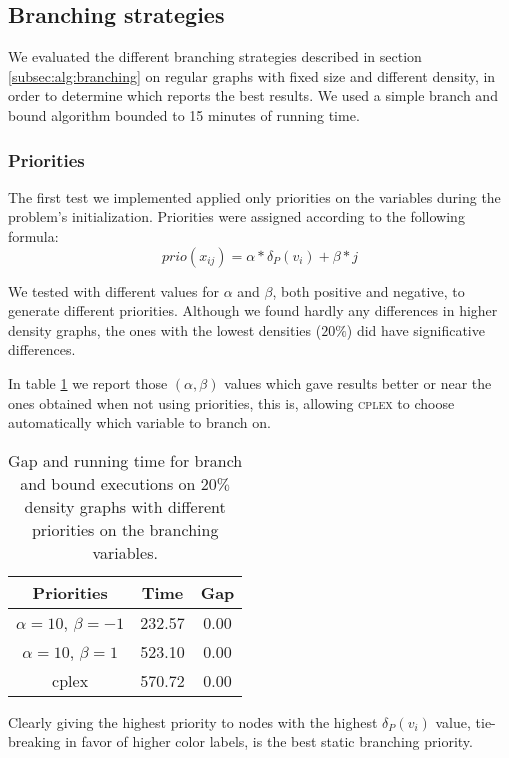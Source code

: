 
\subsection{Branching strategies}
\label{subsec:resultsbranching}

We evaluated the different branching strategies described in section \ref{subsec:alg:branching} on regular graphs with fixed size and different density, in order to determine which reports the best results. We used a simple branch and bound algorithm bounded to 15 minutes of running time.

\subsubsection*{Priorities}

The first test we implemented applied only priorities on the variables during the problem's initialization. Priorities were assigned according to the following formula:
\begin{equation*}
	prio(x_{ij}) = \alpha * \delta_P(v_i) + \beta * j
\end{equation*}

We tested with different values for $\alpha$ and $\beta$, both positive and negative, to generate different priorities. Although we found hardly any differences in higher density graphs, the ones with the lowest densities ($20\%$) did have significative differences.

In table \ref{table:branch:static} we report those $(\alpha,\beta)$ values which gave results better or near the ones obtained when not using priorities, this is, allowing \textsc{cplex} to choose automatically which variable to branch on.

\begin{table}
\label{table:branch:static}
\centering

\begin{tabular}{|c|c|c|}
\hline
\textbf{Priorities} & \textbf{Time} & \textbf{Gap} \\
\hline
$\alpha = 10$, $\beta = -1$ &  232.57 & 0.00 \\
$\alpha = 10$, $\beta = 1$ & 523.10 & 0.00 \\
cplex & 570.72 & 0.00 \\
\hline
 \end{tabular}

Clearly giving the highest priority to nodes with the highest $\delta_P(v_i)$ value, tie-breaking in favor of higher color labels, is the best static branching priority.

\caption{Gap and running time for branch and bound executions on $20\%$ density graphs with different priorities on the branching variables.}

\end{table}	

